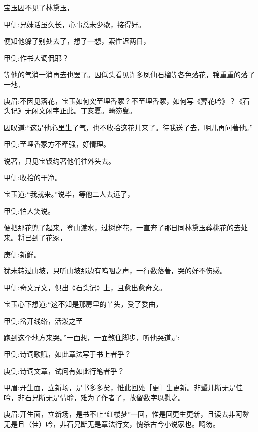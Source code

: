 \begin{parag}
    宝玉因不见了林黛玉，\begin{note}甲侧:兄妹话虽久长，心事总未少歇，接得好。\end{note}便知他躲了别处去了，想了一想，索性迟两日，\begin{note}甲侧:作书人调侃耶？\end{note}等他的气消一消再去也罢了。因低头看见许多凤仙石榴等各色落花，锦重重的落了一地，\begin{note}庚眉:不因见落花，宝玉如何突至埋香冢？不至埋香冢，如何写《葬花吟》？《石头记》无闲文闲字正此。丁亥夏。畸笏叟。\end{note}因叹道:“这是他心里生了气，也不收拾这花儿来了。待我送了去，明儿再问著他。”\begin{note}甲侧:至埋香冢方不牵强，好情理。\end{note}说著，只见宝钗约著他们往外头去。\begin{note}甲侧:收拾的干净。\end{note}宝玉道:“我就来。”说毕，等他二人去远了，\begin{note}甲侧:怕人笑说。\end{note}便把那花兜了起来，登山渡水，过树穿花，一直奔了那日同林黛玉葬桃花的去处来。将已到了花冢，\begin{note}庚侧:新鲜。\end{note}犹未转过山坡，只听山坡那边有呜咽之声，一行数落著，哭的好不伤感。\begin{note}甲侧:奇文异文，俱出《石头记》上，且愈出愈奇文。\end{note}宝玉心下想道:“这不知是那房里的丫头，受了委曲，\begin{note}甲侧:岔开线络，活泼之至！\end{note}跑到这个地方来哭。”一面想，一面煞住脚步，听他哭道是:\begin{note}甲侧:诗词歌赋，如此章法写于书上者乎？\end{note}\begin{note}庚侧:诗词文章，试问有如此行笔者乎？\end{note}\begin{note}甲眉:开生面，立新场，是书多多矣，惟此回处［更］生更新。非颦儿断无是佳吟，非石兄断无是情聆，难为了作者了，故留数字以慰之。\end{note}\begin{note}庚眉:开生面，立新场，是书不止“红楼梦”一回，惟是回更生更新，且读去非阿颦无是且（佳）吟，非石兄断无是章法行文，愧杀古今小说家也。畸笏。\end{note}
\end{parag}


